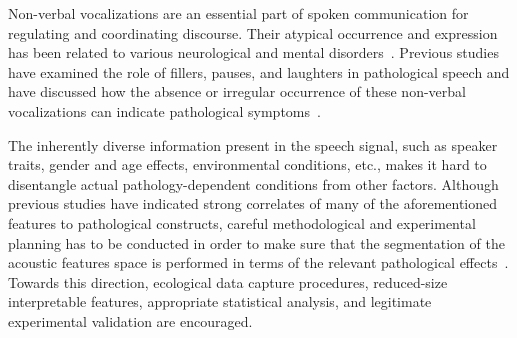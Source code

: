 \documentclass{article}
\begin{document}
Non-verbal vocalizations are an essential part of spoken communication for regulating and coordinating discourse. Their atypical occurrence and expression has been related to various neurological and mental disorders~\cite{lake2011listener}. Previous studies have examined the role of fillers, pauses, and laughters in pathological speech and have discussed how the absence or irregular occurrence of these non-verbal vocalizations can indicate pathological symptoms~\cite{heeman2010autism,gupta2014predicting}.

The inherently diverse information present in the speech signal, such as speaker traits, gender and age effects, environmental conditions, etc., makes it hard to disentangle actual pathology-dependent conditions from other factors. Although previous studies have indicated strong correlates of many of the aforementioned features to pathological constructs, careful methodological and experimental planning has to be conducted in order to make sure that the segmentation of the acoustic features space is performed in terms of the relevant pathological effects~\cite{bone2013classifying}. Towards this direction, ecological data capture procedures, reduced-size interpretable features, appropriate statistical analysis, and legitimate experimental validation are encouraged.
\end{document}
